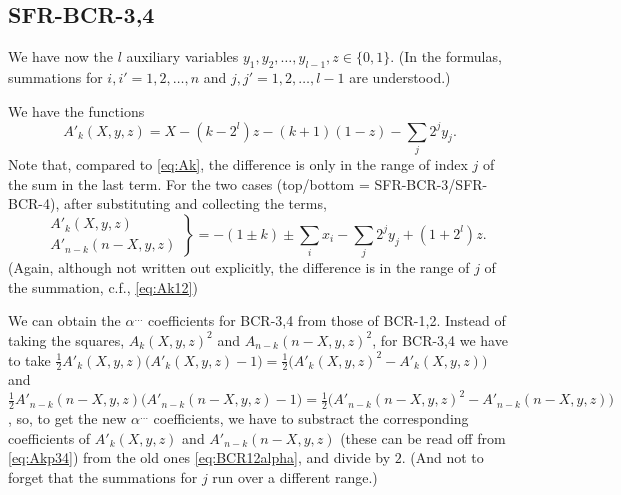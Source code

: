 \documentclass[a4paper,english,notitlepage,longbibliography,showpacs,preprintnumbers,amsmath,amssymb,aps,prx,nofootinbib,12pt,superscriptaddress]{revtex4-1}
\begin{document}

\subsection{SFR-BCR-3,4}
We have now the $l$ auxiliary variables $y_1,y_2,\dots,y_{l-1},z\in\{0,1\}$.
(In the formulas, summations for $i,i' = 1,2,\dots,n$ and $j,j' = 1,2,\dots,l-1$ are understood.)

We have the functions
\begin{equation}
\label{eq:Akp}
A'_k(X,y,z) = X - (k-2^l)z - (k+1)(1-z) - \sum_{j}2^jy_j.
\end{equation}
Note that, compared to \eqref{eq:Ak},
 the difference is only in the range of index $j$ of the sum in the last term.
For the  two cases
(top/bottom = SFR-BCR-3/SFR-BCR-4),
after substituting and collecting the terms,
\begin{equation}
\label{eq:Akp34}
\left.\begin{aligned}
&A'_k(X,y,z) \\
&A'_{n-k}({n-X},y,z)
\end{aligned}\right\}
= -(1\pm k) \pm \sum_i x_i - \sum_j 2^jy_j + (1+2^l)z.
\end{equation}
(Again, although not written out explicitly,
the difference is in the range of $j$ of the summation, c.f., \eqref{eq:Ak12})

We can obtain the $\alpha^{\dots}$ coefficients for BCR-3,4
from those of BCR-1,2.
Instead of taking the squares, $A_k(X,y,z)^2$ and $A_{n-k}(n-X,y,z)^2$,
for BCR-3,4 we have to take
$\frac12 A'_k(X,y,z)\bigl(A'_k(X,y,z)-1\bigr)=\frac12\bigl(A'_k(X,y,z)^2-A'_k(X,y,z)\bigr)$ and
$\frac12 A'_{n-k}(n-X,y,z)\bigl(A'_{n-k}(n-X,y,z)-1\bigr)=\frac12\bigl(A'_{n-k}(n-X,y,z)^2-A'_{n-k}(n-X,y,z)\bigr)$,
so, to get the new $\alpha^{\dots}$ coefficients,
we have to substract the corresponding coefficients of $A'_k(X,y,z)$ and $A'_{n-k}(n-X,y,z)$
(these can be read off from \eqref{eq:Akp34})
from the old ones \eqref{eq:BCR12alpha}, and divide by $2$.
(And not to forget that the summations for $j$ run over a different range.)
\end{document}
